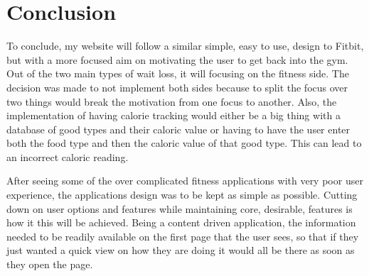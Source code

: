 \section{Conclusion}
To conclude, my website will follow a similar simple, easy to use, design to Fitbit, but with a more focused aim on motivating the user to get back into the gym. Out of the two main types of wait loss, it will focusing on the fitness side. The decision was made to not implement both sides because to split the focus over two things would break the motivation from one focus to another. Also, the implementation of having calorie tracking would either be a big thing with a database of good types and their caloric value or having to have the user enter both the food type and then the caloric value of that good type. This can lead to an incorrect caloric reading.

After seeing some of the over complicated fitness applications with very poor user experience, the applications design was to be kept as simple as possible. Cutting down on user options and features while maintaining core, desirable, features is how it this will be achieved. Being a content driven application, the information needed to be readily available on the first page that the user sees, so that if they just wanted a quick view on how they are doing it would all be there as soon as they open the page.
